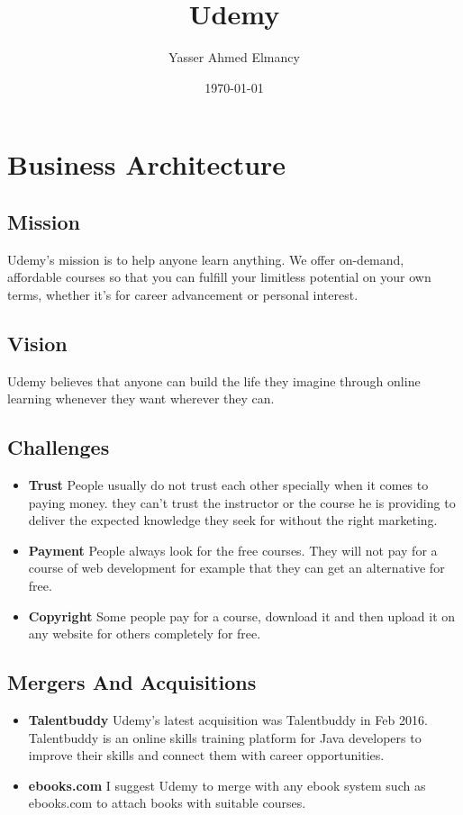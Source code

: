 \documentclass{book}
\begin{document}
	
	\title{Udemy}
	\author{Yasser Ahmed Elmancy}
	\date{\today}
	\maketitle
	
	\tableofcontents
	\newpage
	
	
	\chapter{Business Architecture}
	\section{Mission}
	Udemy's mission is to help anyone learn anything. We offer on-demand, affordable courses so that you can fulfill your limitless potential on your own terms, whether it’s for career advancement or personal interest.
	
	\section{Vision}
	Udemy believes that anyone can build the life they imagine through online learning whenever they want wherever they can.
	
	\section{Challenges}
	
	\begin{itemize}
		\item \textbf{Trust}
		People usually do not trust each other specially when it comes to paying money. they can't trust the instructor or the course he is providing to deliver the expected knowledge they seek for without the right marketing.
		
		\item \textbf{Payment}
		People always look for the free courses. They will not pay for a course of web development for example that they can get an alternative for free.
		
		\item \textbf{Copyright}
		Some people pay for a course, download it and then upload it on any website for others completely for free.
		 
	\end{itemize}
	
	\section{Mergers And Acquisitions}
		\begin{itemize}
		\item \textbf{Talentbuddy}
		Udemy's latest acquisition was Talentbuddy in Feb 2016. Talentbuddy is an online skills training platform for Java developers to improve their skills and connect them with career opportunities.
		
		\item \textbf{ebooks.com}
		I suggest Udemy to merge with any ebook system such as ebooks.com to attach books with suitable courses.
		
	\end{itemize}
	
\end{document}
